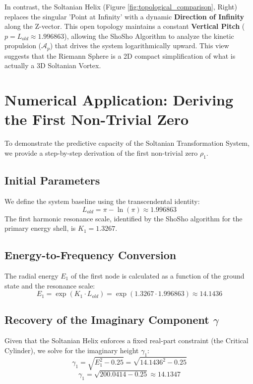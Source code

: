 \documentclass[11pt,a4paper]{article}
\begin{document}
In contrast, the Soltanian Helix (Figure \ref{fig:topological_comparison}, Right) replaces the singular 'Point at Infinity' with a dynamic \textbf{Direction of Infinity} along the Z-vector. This open topology maintains a constant \textbf{Vertical Pitch} ($p = L_{old} \approx 1.996863$), allowing the ShoSho Algorithm to analyze the kinetic propulsion ($\mathcal{A}_p$) that drives the system logarithmically upward. This view suggests that the Riemann Sphere is a 2D compact simplification of what is actually a 3D Soltanian Vortex.

\section{Numerical Application: Deriving the First Non-Trivial Zero}

To demonstrate the predictive capacity of the Soltanian Transformation System, we provide a step-by-step derivation of the first non-trivial zero $\rho_1$. 

\subsection{Initial Parameters}
We define the system baseline using the transcendental identity:
\begin{equation}
    L_{old} = \pi - \ln(\pi) \approx 1.996863
\end{equation}
The first harmonic resonance scale, identified by the ShoSho algorithm for the primary energy shell, is $K_1 = 1.3267$.

\subsection{Energy-to-Frequency Conversion}
The radial energy $E_1$ of the first node is calculated as a function of the ground state and the resonance scale:
\begin{equation}
    E_1 = \exp(K_1 \cdot L_{old}) = \exp(1.3267 \cdot 1.996863) \approx 14.1436
\end{equation}

\subsection{Recovery of the Imaginary Component $\gamma$}
Given that the Soltanian Helix enforces a fixed real-part constraint (the Critical Cylinder), we solve for the imaginary height $\gamma_1$:
\begin{equation}
    \gamma_1 = \sqrt{E_1^2 - 0.25} = \sqrt{14.1436^2 - 0.25}
\end{equation}
\begin{equation}
    \gamma_1 = \sqrt{200.0414 - 0.25} \approx 14.1347
\end{equation}
\end{document}
